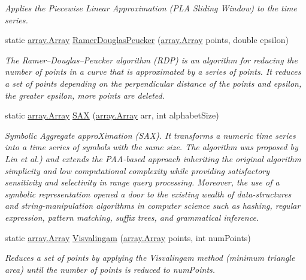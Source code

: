 \begin{DoxyCompactItemize}
\begin{DoxyCompactList}\small\item\em Applies the Piecewise Linear Approximation (P\+LA Sliding Window) to the time series. \end{DoxyCompactList}\item 
static \mbox{\hyperlink{classkhiva_1_1array_1_1_array}{array.\+Array}} \mbox{\hyperlink{classkhiva_1_1dimensionality_1_1_dimensionality_a6d2b5b3b9a7ce8f22f61e4e149975fa4}{Ramer\+Douglas\+Peucker}} (\mbox{\hyperlink{classkhiva_1_1array_1_1_array}{array.\+Array}} points, double epsilon)
\begin{DoxyCompactList}\small\item\em The Ramer–\+Douglas–\+Peucker algorithm (R\+DP) is an algorithm for reducing the number of points in a curve that is approximated by a series of points. It reduces a set of points depending on the perpendicular distance of the points and epsilon, the greater epsilon, more points are deleted. \end{DoxyCompactList}\item 
static \mbox{\hyperlink{classkhiva_1_1array_1_1_array}{array.\+Array}} \mbox{\hyperlink{classkhiva_1_1dimensionality_1_1_dimensionality_a668eb21bc1cce2ce731a7e6f6b3b2a0d}{S\+AX}} (\mbox{\hyperlink{classkhiva_1_1array_1_1_array}{array.\+Array}} arr, int alphabet\+Size)
\begin{DoxyCompactList}\small\item\em Symbolic Aggregate appro\+Ximation (S\+AX). It transforms a numeric time series into a time series of symbols with the same size. The algorithm was proposed by Lin et al.) and extends the P\+A\+A-\/based approach inheriting the original algorithm simplicity and low computational complexity while providing satisfactory sensitivity and selectivity in range query processing. Moreover, the use of a symbolic representation opened a door to the existing wealth of data-\/structures and string-\/manipulation algorithms in computer science such as hashing, regular expression, pattern matching, suffix trees, and grammatical inference. \end{DoxyCompactList}\item 
static \mbox{\hyperlink{classkhiva_1_1array_1_1_array}{array.\+Array}} \mbox{\hyperlink{classkhiva_1_1dimensionality_1_1_dimensionality_ae2b4c8288f9537bce116837abe7e0539}{Visvalingam}} (\mbox{\hyperlink{classkhiva_1_1array_1_1_array}{array.\+Array}} points, int num\+Points)
\begin{DoxyCompactList}\small\item\em Reduces a set of points by applying the Visvalingam method (minimum triangle area) until the number of points is reduced to num\+Points. \end{DoxyCompactList}\end{DoxyCompactItemize}


